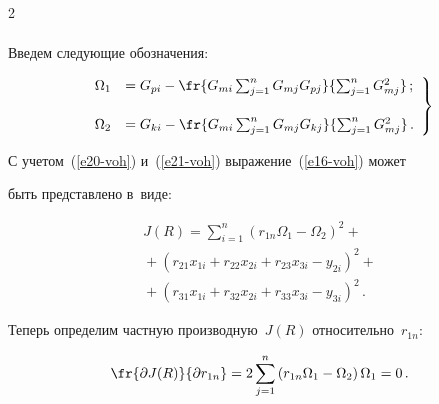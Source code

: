 \begin{multicols}{2}
\begin{multline}
  \label{e20-voh}

  \end{multline}

  

  Введем следующие обозначения:

  \begin{equation}

  \left.

  \begin{array}{rl}

  \Omega_1 &= G_{pi} -\fr{G_{mi} \sum\nolimits^n_{j=1} G_{mj}G_{pj}} 

{\sum\nolimits^n_{j=1} G_{mj}^2}\,;\\[16pt]

  \Omega_2 &= G_{ki} -\fr{ G_{mi} \sum\nolimits^n_{j=1} G_{mj}G_{kj}} 

{\sum\nolimits^n_{j=1} G_{mj}^2}\,.

  \end{array}

  \right\}

  \label{e21-voh}

  \end{equation}

  

  С учетом~(\ref{e20-voh}) и~(\ref{e21-voh}) выражение~(\ref{e16-voh}) может 

быть пред\-став\-ле\-но в~виде:

  \begin{multline*}

  J(R)=\sum\limits^n_{i=1} \left( r_{1n} \Omega_1-\Omega_2\right)^2+{}\\

  {}+

  \left( r_{21}x_{1i} +r_{22}x_{2i} +r_{23}x_{3i}-y_{2i}\right)^2+{}\\

  {}+ \left( r_{31}x_{1i} +r_{32}x_{2i} +r_{33}x_{3i}-y_{3i}\right)^2\,.


  \end{multline*}

  

  Теперь определим част\-ную производную~$J(R)$ относительно~$r_{1n}$:

  \begin{equation*}

  \fr{\partial J(R)}{\partial r_{1{n}}} =2\sum\limits^n_{j=1} \left( r_{1n} 

\Omega_1 -\Omega_2\right) \Omega_1=0\,.


\end{equation*}
\end{multicols}

